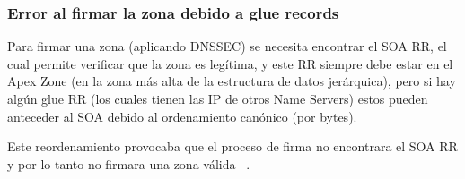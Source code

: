 \subsubsection{Error al firmar la zona debido a glue records}

Para firmar una zona (aplicando DNSSEC) se necesita encontrar el SOA RR, el cual permite verificar que la zona es legítima, y este RR siempre 
debe estar en el Apex Zone (en la zona más alta de la estructura de datos jerárquica), pero si hay algún glue RR 
(los cuales tienen las IP de otros Name Servers) estos pueden anteceder al SOA debido al ordenamiento canónico (por bytes).

Este reordenamiento provocaba que el proceso de firma no encontrara el SOA RR y por lo tanto no firmara una zona válida ~\cite{NLnetLabsBug}.






